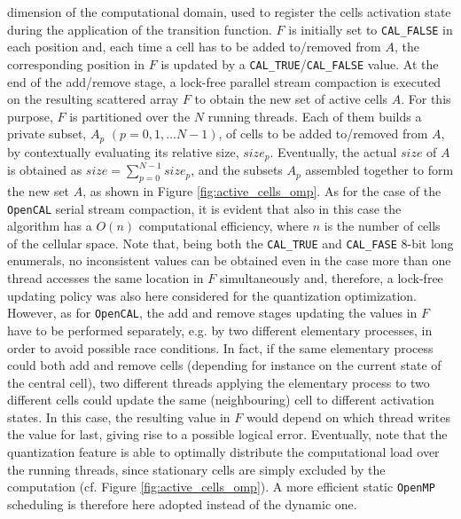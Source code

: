 dimension of the computational domain, used to register the cells
activation state during the application of the transition
function. $F$ is initially set to \verb'CAL_FALSE' in each position
and, each time a cell has to be added to/removed from $A$, the
corresponding position in $F$ is updated by a \verb'CAL_TRUE'/\verb'CAL_FALSE' value. 
At the end of the add/remove
stage, a lock-free parallel stream compaction is executed on the
resulting scattered array $F$ to obtain the new set of active cells
$A$. For this purpose, $F$ is partitioned over the $N$ running
threads. Each of them builds a private subset, $A_p$ $(p=0, 1,
\ldots N-1)$, of cells to be added to/removed from $A$, by
contextually evaluating its relative size, $size_p$. Eventually, the
actual $size$ of $A$ is obtained as $size = \sum_{p=0}^{N-1}
size_p$, and the subsets $A_p$ assembled together to form the new
set $A$, as shown in Figure \ref{fig:active_cells_omp}. As for the
case of the \texttt{OpenCAL} serial stream compaction, it is evident that
also in this case the algorithm has a $O(n)$ computational
efficiency, where $n$ is the number of cells of the cellular
space. Note that, being both the \verb'CAL_TRUE' and \verb'CAL_FASE'
8-bit long enumerals, no inconsistent values can be obtained even in
the case more than one thread accesses the same location in $F$
simultaneously and, therefore, a lock-free updating policy was also
here considered for the quantization optimization. However, as for
\texttt{OpenCAL}, the add and remove stages updating the values in $F$ have
to be performed separately, e.g. by two different elementary
processes, in order to avoid possible race conditions. In fact, if
the same elementary process could both add and remove cells
(depending for instance on the current state of the central cell),
two different threads applying the elementary process to two
different cells could update the same (neighbouring) cell to
different activation states. In this case, the resulting value in
$F$ would depend on which thread writes the value for last, giving
rise to a possible logical error. Eventually, note that the
quantization feature is able to optimally distribute the
computational load over the running threads, since stationary cells
are simply excluded by the computation (cf. Figure
\ref{fig:active_cells_omp}). A more efficient static \texttt{OpenMP}
scheduling is therefore here adopted instead of the dynamic one.

